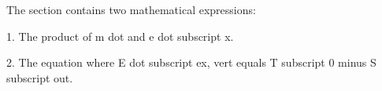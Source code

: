 The section contains two mathematical expressions:

1. The product of m dot and e dot subscript x.

2. The equation where E dot subscript ex, vert equals T subscript 0 minus S subscript out.